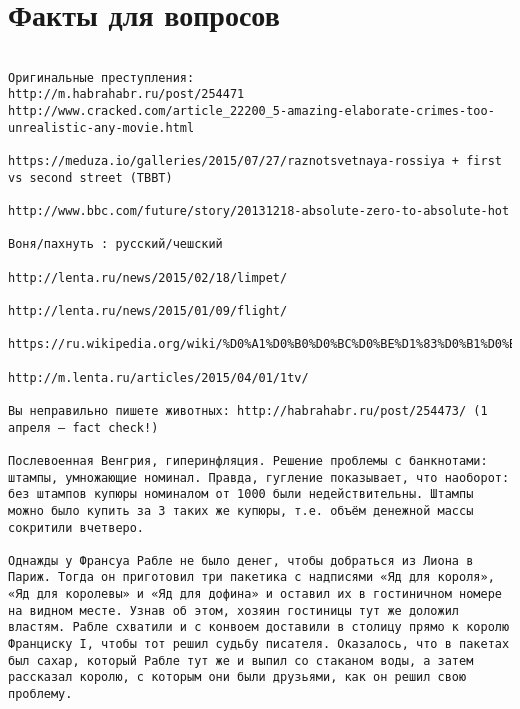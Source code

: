 \documentclass[a4paper,10pt]{article}
\begin{document}
\section{Факты для вопросов}

\begin{verbatim}

Оригинальные преступления:
http://m.habrahabr.ru/post/254471
http://www.cracked.com/article_22200_5-amazing-elaborate-crimes-too-unrealistic-any-movie.html

https://meduza.io/galleries/2015/07/27/raznotsvetnaya-rossiya + first vs second street (TBBT)

http://www.bbc.com/future/story/20131218-absolute-zero-to-absolute-hot

Воня/пахнуть : русский/чешский

http://lenta.ru/news/2015/02/18/limpet/

http://lenta.ru/news/2015/01/09/flight/

https://ru.wikipedia.org/wiki/%D0%A1%D0%B0%D0%BC%D0%BE%D1%83%D0%B1%D0%B8%D0%B9%D1%81%D1%82%D0%B2%D0%BE_%D0%A0%D0%BE%D0%BD%D0%B0%D0%BB%D0%B4%D0%B0_%D0%9E%D0%BF%D1%83%D1%81%D0%B0

http://m.lenta.ru/articles/2015/04/01/1tv/

Вы неправильно пишете животных: http://habrahabr.ru/post/254473/ (1 апреля — fact check!)

Послевоенная Венгрия, гиперинфляция. Решение проблемы с банкнотами: штампы, умножающие номинал. Правда, гугление показывает, что наоборот: без штампов купюры номиналом от 1000 были недействительны. Штампы можно было купить за 3 таких же купюры, т.е. объём денежной массы сокритили вчетверо.

Однажды у Франсуа Рабле не было денег, чтобы добраться из Лиона в Париж. Тогда он приготовил три пакетика с надписями «Яд для короля», «Яд для королевы» и «Яд для дофина» и оставил их в гостиничном номере на видном месте. Узнав об этом, хозяин гостиницы тут же доложил властям. Рабле схватили и с конвоем доставили в столицу прямо к королю Франциску I, чтобы тот решил судьбу писателя. Оказалось, что в пакетах был сахар, который Рабле тут же и выпил со стаканом воды, а затем рассказал королю, с которым они были друзьями, как он решил свою проблему.

\end{verbatim}
\end{document}
